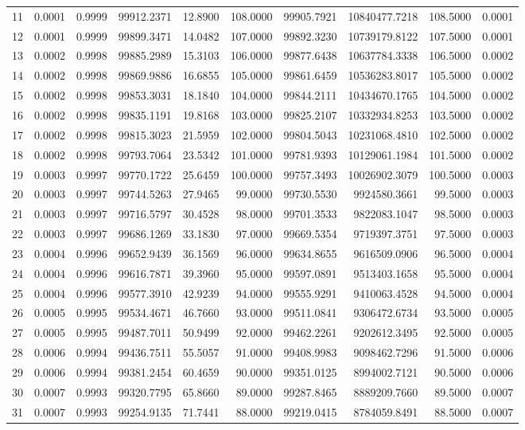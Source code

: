 \documentclass[11pt]{article}
\begin{document}
\begin{tabular}{|r|r|r|r|r|r|r|r|r|r|}
11 & 0.0001 & 0.9999 &  99912.2371 &   12.8900 & 108.0000 & 99905.7921 & 10840477.7218 & 108.5000 & 0.0001 \\
12 & 0.0001 & 0.9999 &  99899.3471 &   14.0482 & 107.0000 & 99892.3230 & 10739179.8122 & 107.5000 & 0.0001 \\
13 & 0.0002 & 0.9998 &  99885.2989 &   15.3103 & 106.0000 & 99877.6438 & 10637784.3338 & 106.5000 & 0.0002 \\
14 & 0.0002 & 0.9998 &  99869.9886 &   16.6855 & 105.0000 & 99861.6459 & 10536283.8017 & 105.5000 & 0.0002 \\
15 & 0.0002 & 0.9998 &  99853.3031 &   18.1840 & 104.0000 & 99844.2111 & 10434670.1765 & 104.5000 & 0.0002 \\
16 & 0.0002 & 0.9998 &  99835.1191 &   19.8168 & 103.0000 & 99825.2107 & 10332934.8253 & 103.5000 & 0.0002 \\
17 & 0.0002 & 0.9998 &  99815.3023 &   21.5959 & 102.0000 & 99804.5043 & 10231068.4810 & 102.5000 & 0.0002 \\
18 & 0.0002 & 0.9998 &  99793.7064 &   23.5342 & 101.0000 & 99781.9393 & 10129061.1984 & 101.5000 & 0.0002 \\
19 & 0.0003 & 0.9997 &  99770.1722 &   25.6459 & 100.0000 & 99757.3493 & 10026902.3079 & 100.5000 & 0.0003 \\
20 & 0.0003 & 0.9997 &  99744.5263 &   27.9465 &  99.0000 & 99730.5530 &  9924580.3661 &  99.5000 & 0.0003 \\
21 & 0.0003 & 0.9997 &  99716.5797 &   30.4528 &  98.0000 & 99701.3533 &  9822083.1047 &  98.5000 & 0.0003 \\
22 & 0.0003 & 0.9997 &  99686.1269 &   33.1830 &  97.0000 & 99669.5354 &  9719397.3751 &  97.5000 & 0.0003 \\
23 & 0.0004 & 0.9996 &  99652.9439 &   36.1569 &  96.0000 & 99634.8655 &  9616509.0906 &  96.5000 & 0.0004 \\
24 & 0.0004 & 0.9996 &  99616.7871 &   39.3960 &  95.0000 & 99597.0891 &  9513403.1658 &  95.5000 & 0.0004 \\
25 & 0.0004 & 0.9996 &  99577.3910 &   42.9239 &  94.0000 & 99555.9291 &  9410063.4528 &  94.5000 & 0.0004 \\
26 & 0.0005 & 0.9995 &  99534.4671 &   46.7660 &  93.0000 & 99511.0841 &  9306472.6734 &  93.5000 & 0.0005 \\
27 & 0.0005 & 0.9995 &  99487.7011 &   50.9499 &  92.0000 & 99462.2261 &  9202612.3495 &  92.5000 & 0.0005 \\
28 & 0.0006 & 0.9994 &  99436.7511 &   55.5057 &  91.0000 & 99408.9983 &  9098462.7296 &  91.5000 & 0.0006 \\
29 & 0.0006 & 0.9994 &  99381.2454 &   60.4659 &  90.0000 & 99351.0125 &  8994002.7121 &  90.5000 & 0.0006 \\
30 & 0.0007 & 0.9993 &  99320.7795 &   65.8660 &  89.0000 & 99287.8465 &  8889209.7660 &  89.5000 & 0.0007 \\
31 & 0.0007 & 0.9993 &  99254.9135 &   71.7441 &  88.0000 & 99219.0415 &  8784059.8491 &  88.5000 & 0.0007 \\
 	\hline
 \end{tabular}
\end{document}
